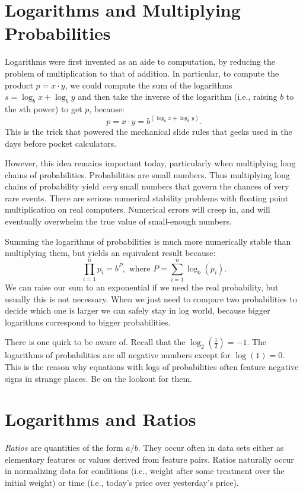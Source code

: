 \documentclass[10pt]{article}
\begin{document}
\section{Logarithms and Multiplying Probabilities}
Logarithms were first invented as an aide to computation, by reducing the problem of multiplication to that of addition. In particular, to compute the product $p = x \cdot y$, we could compute the sum of the logarithms $s = \log_b x + \log_b y$ and then take the inverse of the logarithm (i.e., raising $b$ to the $s$th power) to get $p$, because:
\[
p = x \cdot y = b^{(\log_b x + \log_b y)}.
\]
This is the trick that powered the mechanical slide rules that geeks used in the days before pocket calculators.

However, this idea remains important today, particularly when multiplying long chains of probabilities. Probabilities are small numbers. Thus multiplying long chains of probability yield \textit{very} small numbers that govern the chances of very rare events. There are serious numerical stability problems with floating point multiplication on real computers. Numerical errors will creep in, and will eventually overwhelm the true value of small-enough numbers.

Summing the logarithms of probabilities is much more numerically stable than multiplying them, but yields an equivalent result because:
\[
\prod_{i=1}^{n} p_i = b^P, \text{ where } P = \sum_{i=1}^{n} \log_b(p_i).
\]
We can raise our sum to an exponential if we need the real probability, but usually this is not necessary. When we just need to compare two probabilities to decide which one is larger we can safely stay in log world, because bigger logarithms correspond to bigger probabilities.

There is one quirk to be aware of. Recall that the $\log_2\left(\frac{1}{2}\right) = -1$. The logarithms of probabilities are all negative numbers except for $\log(1) = 0$. This is the reason why equations with logs of probabilities often feature negative signs in strange places. Be on the lookout for them.

\section{Logarithms and Ratios}
\textit{Ratios} are quantities of the form $a/b$. They occur often in data sets either as elementary features or values derived from feature pairs. Ratios naturally occur in normalizing data for conditions (i.e., weight after some treatment over the initial weight) or time (i.e., today’s price over yesterday’s price).
\end{document}
